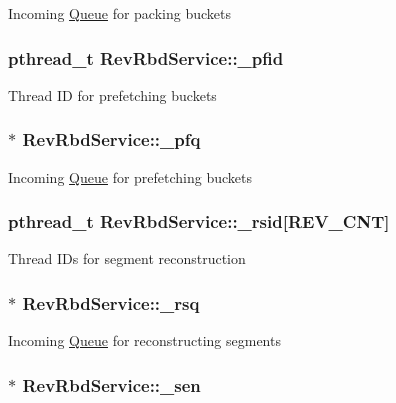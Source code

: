 \-Incoming \hyperlink{structQueue}{\-Queue} for packing buckets \hypertarget{structRevRbdService_abba6684c1168e9eaaa4d53d6e547ccbc}{
\subsubsection[{\-\_\-pfid}]{\setlength{\rightskip}{0pt plus 5cm}pthread\-\_\-t {\bf \-Rev\-Rbd\-Service\-::\-\_\-pfid}}}\label{structRevRbdService_abba6684c1168e9eaaa4d53d6e547ccbc}
\-Thread \-I\-D for prefetching buckets \hypertarget{structRevRbdService_ad55d2145589178ad0e49d6484a4b0b85}{
\subsubsection[{\-\_\-pfq}]{$\ast$ {\bf \-Rev\-Rbd\-Service\-::\-\_\-pfq}}}\label{structRevRbdService_ad55d2145589178ad0e49d6484a4b0b85}
\-Incoming \hyperlink{structQueue}{\-Queue} for prefetching buckets \hypertarget{structRevRbdService_af488d651610680160d538fb9a1e65d11}{
\subsubsection[{\-\_\-rsid}]{\setlength{\rightskip}{0pt plus 5cm}pthread\-\_\-t {\bf \-Rev\-Rbd\-Service\-::\-\_\-rsid}\mbox{[}{\bf \-R\-E\-V\-\_\-\-C\-N\-T}\mbox{]}}}\label{structRevRbdService_af488d651610680160d538fb9a1e65d11}
\-Thread \-I\-Ds for segment reconstruction \hypertarget{structRevRbdService_ad51b5fc844ba1061968692a4eb141d8f}{
\subsubsection[{\-\_\-rsq}]{$\ast$ {\bf \-Rev\-Rbd\-Service\-::\-\_\-rsq}}}\label{structRevRbdService_ad51b5fc844ba1061968692a4eb141d8f}
\-Incoming \hyperlink{structQueue}{\-Queue} for reconstructing segments \hypertarget{structRevRbdService_a87df01a0edb89ffa2c5c4687c06cf1c4}{
\subsubsection[{\-\_\-sen}]{$\ast$ {\bf \-Rev\-Rbd\-Service\-::\-\_\-sen}}}\label{structRevRbdService_a87df01a0edb89ffa2c5c4687c06cf1c4}
